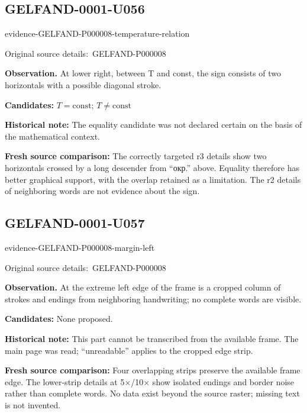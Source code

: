 \documentclass[11pt]{article}
\newcommand{\EvidenceBlock}[4]{%
 \par\smallskip\noindent\begin{minipage}{\linewidth}
 \begin{minipage}[t]{.47\linewidth}\vspace{0pt}\centering
 \csname evidence-#1-#2\endcsname\par
 {\scriptsize\SourceCropCaption\ #1}\par
 \end{minipage}\hfill
 \begin{minipage}[t]{.49\linewidth}\vspace{0pt}\raggedright
 {\small\color{orange!65!black}\textbf{#4} #3}\par
 \end{minipage}
 \end{minipage}\par\smallskip}
\newcommand{\SourceCropCaption}{Original source details:}\newcommand{\ReadingCaption}{Uncertain reading.}\newcommand{\IncompleteCaption}{Undeciphered passage.}\newcommand{\DiagramCaption}{Diagram and typed description.}
\begin{document}
\subsection*{GELFAND-0001-U056}
\EvidenceBlock{GELFAND-P000008}{temperature-relation}{At lower right, between T and const, the sign consists of two horizontals with a possible diagonal stroke.}{Observation.}
\par\smallskip\noindent\textbf{Candidates: } \(T=\mathrm{const}\); \(T\ne\mathrm{const}\)\par
\par\smallskip\noindent\textbf{Historical note: } The equality candidate was not declared certain on the basis of the mathematical context.\par
\par\smallskip\noindent\textbf{Fresh source comparison: } The correctly targeted r3 details show two horizontals crossed by a long descender from “окр.” above. Equality therefore has better graphical support, with the overlap retained as a limitation. The r2 details of neighboring words are not evidence about the sign.\par

\subsection*{GELFAND-0001-U057}
\EvidenceBlock{GELFAND-P000008}{margin-left}{At the extreme left edge of the frame is a cropped column of strokes and endings from neighboring handwriting; no complete words are visible.}{Observation.}
\par\smallskip\noindent\textbf{Candidates: } None proposed.\par
\par\smallskip\noindent\textbf{Historical note: } This part cannot be transcribed from the available frame. The main page was read; “unreadable” applies to the cropped edge strip.\par
\par\smallskip\noindent\textbf{Fresh source comparison: } Four overlapping strips preserve the available frame edge. The lower-strip details at 5×/10× show isolated endings and border noise rather than complete words. No data exist beyond the source raster; missing text is not invented.\par
\end{document}
